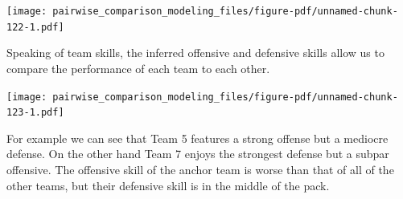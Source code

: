 \documentclass[
  letterpaper,
  DIV=11,
  numbers=noendperiod]{scrartcl}
\newenvironment{Shaded}{\begin{snugshade}}{\end{snugshade}}
\newcommand{\AttributeTok}[1]{\textcolor[rgb]{0.40,0.45,0.13}{#1}}
\newcommand{\ControlFlowTok}[1]{\textcolor[rgb]{0.00,0.23,0.31}{#1}}
\newcommand{\DecValTok}[1]{\textcolor[rgb]{0.68,0.00,0.00}{#1}}
\newcommand{\FunctionTok}[1]{\textcolor[rgb]{0.28,0.35,0.67}{#1}}
\newcommand{\NormalTok}[1]{\textcolor[rgb]{0.00,0.23,0.31}{#1}}
\newcommand{\OtherTok}[1]{\textcolor[rgb]{0.00,0.23,0.31}{#1}}
\newcommand{\SpecialCharTok}[1]{\textcolor[rgb]{0.37,0.37,0.37}{#1}}
\newcommand{\StringTok}[1]{\textcolor[rgb]{0.13,0.47,0.30}{#1}}
\begin{document}
\texttt{[image: pairwise\_comparison\_modeling\_files/figure-pdf/unnamed-chunk-122-1.pdf]}

Speaking of team skills, the inferred offensive and defensive skills
allow us to compare the performance of each team to each other.

\begin{Shaded}
\end{Shaded}

\texttt{[image: pairwise\_comparison\_modeling\_files/figure-pdf/unnamed-chunk-123-1.pdf]}

For example we can see that Team 5 features a strong offense but a
mediocre defense. On the other hand Team 7 enjoys the strongest defense
but a subpar offensive. The offensive skill of the anchor team is worse
than that of all of the other teams, but their defensive skill is in the
middle of the pack.
\end{document}
